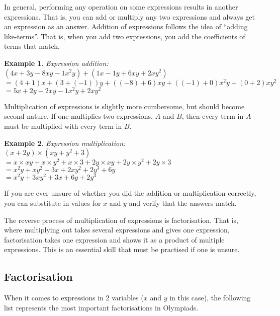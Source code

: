 \documentclass[a4paper,12pt]{article}
\newtheorem{example}{Example}[section]
\begin{document}
In general, performing any operation on some expressions results in another expressions. That is, you can add or multiply any two expressions and always get an expression as an answer. Addition of expressions follows the idea of ``adding like-terms''. That is, when you add two expressions, you add the coefficients of terms that match. \\
\begin{example}
    Expression addition:\\
    $(4x + 3y - 8xy - 1x^2y) + (1x - 1y + 6xy + 2xy^2)$ \\
    $= (4 + 1)x + (3 + (-1))y + ((-8) + 6)xy + ((-1) + 0)x^2y + (0 + 2)xy^2$ \\
    $= 5x + 2y - 2xy - 1x^2y + 2xy^2$ \\
\end{example}
Multiplication of expressions is slightly more cumbersome, but should become second nature. If one multiplies two expressions, $A$ and $B$, then every term in $A$ must be multiplied with every term in $B$. \\
\begin{example}
    Expression multiplication:\\
    $(x + 2y) \times (xy + y^2 + 3) $ \\
    $= x \times xy + x \times y^2 + x \times 3 + 2y \times xy + 2y \times y^2 + 2y \times 3 $ \\
    $= x^2y + xy^2 + 3x + 2xy^2 + 2y^3 + 6y$ \\
    $= x^2y + 3xy^2 + 3x + 6y + 2y^3$ \\
\end{example}
If you are ever unsure of whether you did the addition or multiplication correctly, you can substitute in values for $x$ and $y$ and verify that the answers match.

The reverse process of multiplication of expressions is factorisation. That is, where multiplying out takes several expressions and gives one expression, factorisation takes one expression and shows it as a product of multiple expressions. This is an essential skill that must be practised if one is unsure.

\subsection{Factorisation}
When it comes to expressions in 2 variables ($x$ and $y$ in this case), the following list represents the most important factorisations in Olympiads.
\end{document}
